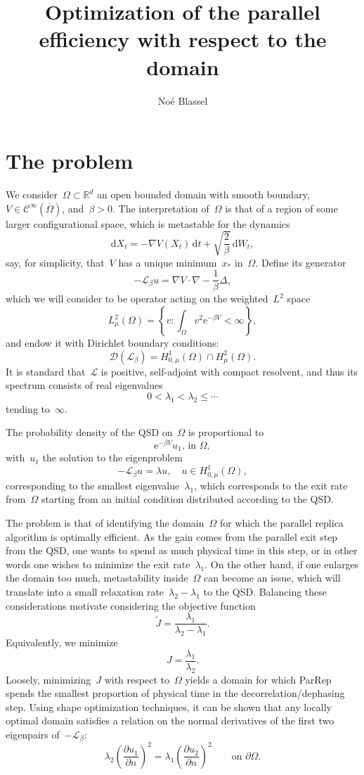 \documentclass{article}
\title{Optimization of the parallel efficiency with respect to the domain}
\author{No\'e Blassel}
\newcommand{\cL}{\mathcal{L}}
\renewcommand{\d}{\mathrm{d}}
\newcommand{\e}{\mathrm{e}}
\newcommand{\R}{\mathbb{R}}
\begin{document}
\maketitle

    \section{The problem}
        We consider~$\Omega\subset \R^d$ an open bounded domain with smooth boundary,~$V\in \mathcal C^\infty (\overline \Omega)$, and~$\beta>0$.
        The interpretation of~$\Omega$ is that of a region of some larger configurational space, which is metastable for the dynamics
        \[\d X_t = -\nabla V(X_t)\,\d t + \sqrt{\frac2\beta}\, \d W_t,\]
        say, for simplicity, that~$V$ has a unique minimum~$x_*$ in~$\Omega$.
        Define its generator
        \[-\cL_\beta u = \nabla V \cdot \nabla - \frac1\beta \Delta,\]
        which we will consider to be operator acting on the weighted~$L^2$ space
        \[L^2_\mu(\Omega) = \left\{ v : \int_\Omega v^2 \e^{-\beta V} < \infty\right\},\]
        and endow it with Dirichlet boundary conditions:
        \[ \mathcal D(\cL_\beta) = H_{0,\mu}^1(\Omega)\cap H^2_\mu(\Omega).\]
        It is standard that~$\cL$ is positive, self-adjoint with compact resolvent, and thus its spectrum consists of real eigenvalues
        \[ 0 <  \lambda_1 < \lambda_2 \leq \dotsm\]
        tending to~$\infty$.

        The probability density of the QSD on~$\Omega$ is proportional to
        \[\e^{-\beta V}u_1,\,\text{in }\Omega,\]
        with~$u_1$ the solution to the eigenproblem
        \[-\cL_\beta u = \lambda u,\quad u\in H_{0,\mu}^1(\Omega),\]
        corresponding to the smallest eigenvalue~$\lambda_1$, which corresponds to the exit rate from~$\Omega$ starting from an initial condition distributed according to the QSD.

        The problem is that of identifying the domain~$\Omega$ for which the parallel replica algorithm is optimally efficient. 
        As the gain comes from the parallel exit step from the QSD, one wants to spend as much physical time in this step, or in other words one wishes to minimize the exit rate~$\lambda_1$. 
        On the other hand, if one enlarges the domain too much, metastability inside~$\Omega$ can become an issue, which will translate into a small relaxation rate~$\lambda_2 - \lambda_1$ to the QSD.
        Balancing these considerations motivate considering the objective function 
        \[\tilde J = \frac{\lambda_1}{\lambda_2-\lambda_1}.\]
        Equivalently, we minimize
        \[ J = \frac{\lambda_1}{\lambda_2}.\]
        Loosely, minimizing~$J$ with respect to~$\Omega$ yields a domain for which ParRep spends the smallest proportion of physical time in the decorrelation/dephasing step.
        Using shape optimization techniques, it can be shown that any locally optimal domain satisfies a relation on the normal derivatives of the first two eigenpairs of~$-\cL_\beta$:
        \[ \lambda_2\left(\frac{\partial u_1}{\partial n}\right)^2 = \lambda_1 \left(\frac{\partial u_2}{\partial n}\right)^2\qquad\text{on } \partial\Omega.\]
\end{document}
